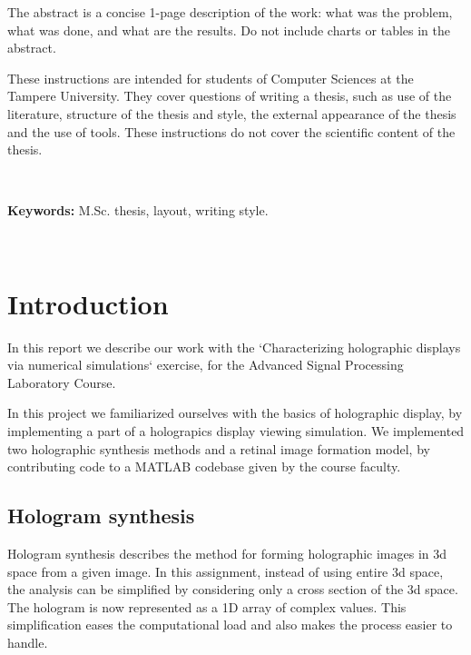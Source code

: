 \documentclass[12pt,a4paper,english
]{tunithesis}
\begin{document}
\vspace{0.5cm}


\noindent The abstract is a concise 1-page description of the work: what was the
problem, what was done, and what are the results. Do not include
charts or tables in the abstract.

These instructions are intended for students of Computer Sciences at the Tampere University. They cover questions of writing a thesis, such as use of the literature, structure of the thesis and style, the external appearance of the thesis and the use of tools.  These instructions do not cover the scientific content of the thesis.

~

\noindent\textbf{Keywords:} M.Sc. thesis, layout, writing style.

~




\setcounter{tocdepth}{3}              %
\tableofcontents                      %


\if@twoside
\cleardoublepage
\fi


\renewcommand{\chaptername}{} %


\chapter{Introduction}
\label{ch:intro}
\setcounter{page}{1} 
In this report we describe our work with the `Characterizing holographic displays via
numerical simulations` exercise, for the Advanced Signal Processing Laboratory Course.

In this project we familiarized ourselves with the basics of holographic display, by implementing a part of a holograpics display viewing simulation. We implemented two holographic synthesis methods and a retinal image formation model, by contributing code to a MATLAB codebase given by the course faculty.

\section{Hologram synthesis}
Hologram synthesis describes the method for forming holographic images in 3d space from a given image. In this assignment, instead of using entire 3d space, the analysis can be simplified by considering only a cross section of the 3d space. The hologram is now represented as a 1D array of complex values. This simplification eases the computational load and also makes the process easier to handle.
\end{document}
